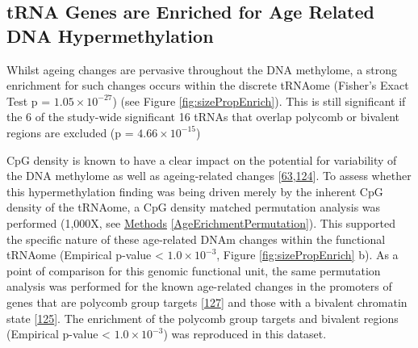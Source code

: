 \documentclass[
]{book}
\begin{document}
\hypertarget{trna-genes-are-enriched-for-age-related-dna-hypermethylation}{%
\subsection{tRNA Genes are Enriched for Age Related DNA Hypermethylation}\label{trna-genes-are-enriched-for-age-related-dna-hypermethylation}}

Whilst ageing changes are pervasive throughout the DNA methylome, a strong enrichment for such changes occurs within the discrete tRNAome (Fisher's Exact Test p = \(1.05\times10^{-27}\)) (see Figure \ref{fig:sizePropEnrich}).
This is still significant if the 6 of the study-wide significant 16 tRNAs that overlap polycomb or bivalent regions are excluded (p = \(4.66\times10^{-15}\))

CpG density is known to have a clear impact on the potential for variability of the DNA methylome as well as ageing-related changes {[}\protect\hyperlink{ref-Ziller2013}{63},\protect\hyperlink{ref-Christensen2009}{124}{]}.
To assess whether this hypermethylation finding was being driven merely by the inherent CpG density of the tRNAome, a CpG density matched permutation analysis was performed (1,000X, see \protect\hyperlink{AgeErichmentPermutation}{Methods} \ref{AgeErichmentPermutation}).
This supported the specific nature of these age-related DNAm changes within the functional tRNAome (Empirical p-value \textless{} \(1.0\times10^{-3}\), Figure \ref{fig:sizePropEnrich} b).
As a point of comparison for this genomic functional unit, the same permutation analysis was performed for the known age-related changes in the promoters of genes that are polycomb group targets {[}\protect\hyperlink{ref-Teschendorff2010}{127}{]} and those with a bivalent chromatin state {[}\protect\hyperlink{ref-Rakyan2010}{125}{]}.
The enrichment of the polycomb group targets and bivalent regions (Empirical p-value \textless{} \(1.0\times10^{-3}\)) was reproduced in this dataset.
\end{document}
